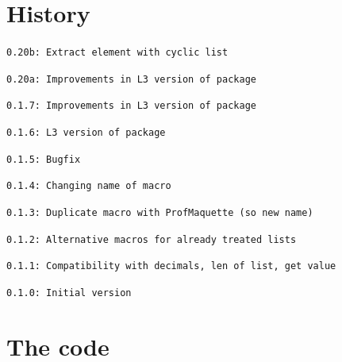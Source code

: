 \documentclass[11pt,a4paper]{ltxdoc}
\begin{document}
\pagebreak

\section{History}

\texttt{0.20b: Extract element with cyclic list}

\texttt{0.20a: Improvements in L3 version of package}

\texttt{0.1.7: Improvements in L3 version of package}

\texttt{0.1.6: L3 version of package}

\texttt{0.1.5: Bugfix}

\texttt{0.1.4: Changing name of macro}

\texttt{0.1.3: Duplicate macro with ProfMaquette (so new name)}

\texttt{0.1.2: Alternative macros for already treated lists}

\texttt{0.1.1: Compatibility with decimals, len of list, get value}

\texttt{0.1.0: Initial version}

\section{The code}

\end{document}
